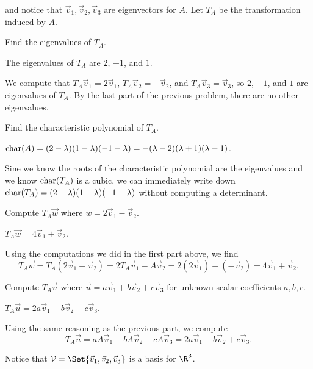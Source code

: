 \documentclass{problemset}
\begin{document}
	and notice that $\vec v_1,\vec v_2,\vec v_3$ are eigenvectors for $A$. Let $T_A$ be the transformation induced by $A$.
	\begin{parts}
		\item Find the eigenvalues of $T_A$.
			\begin{solution}
				The eigenvalues of $T_A$ are $2$, $-1$, and $1$.

				We compute that $T_A\vec v_1=2\vec v_1$, $T_A\vec v_2=-\vec v_2$,
				and $T_A\vec v_3=\vec v_3$, so $2$, $-1$, and $1$ are eigenvalues
				of $T_A$. By the last part of the previous problem, there are no
				other eigenvalues.
			\end{solution}
		\item Find the characteristic polynomial of $T_A$.
			\begin{solution}
				$\operatorname{char}(A)=(2-\lambda)(1-\lambda)(-1-\lambda)=-(\lambda-2)(\lambda+1)(\lambda-1)$.
				
				Sine we know the roots of the characteristic polynomial are the eigenvalues and
				we know $\operatorname{char}(T_A)$ is a cubic, we can immediately write down
				$\operatorname{char}(T_A)=(2-\lambda)(1-\lambda)(-1-\lambda)$ without computing a determinant.
			\end{solution}
		\item Compute $T_A\vec w$ where $w=2\vec v_1-\vec v_2$.
			\begin{solution}
				$T_A\vec w=4\vec v_1+\vec v_2$.

				Using the computations we did in the first part above, we find
				\[
					T_A\vec w
					=T_A(2\vec v_1-\vec v_2)
					=2T_A\vec v_1-A\vec v_2
					=2(2\vec v_1)-(-\vec v_2)
					=4\vec v_1+\vec v_2.
				\]
			\end{solution}
		\item Compute $T_A\vec u$ where $\vec u=a\vec v_1+b\vec v_2+c\vec v_3$ for
			unknown scalar coefficients $a,b,c$.
			\begin{solution}
				$T_A\vec u=2a\vec v_1-b\vec v_2+c\vec v_3$.

				Using the same reasoning as the previous part, we compute
				\[
					T_A\vec u
					=aA\vec v_1+bA\vec v_2+cA\vec v_3
					=2a\vec v_1-b\vec v_2+c\vec v_3.
				\]
			\end{solution}
	\end{parts}
	Notice that $\mathcal V=\Set{\vec v_1,\vec v_2,\vec v_3}$ is a basis for $\R^3$.
\end{document}
